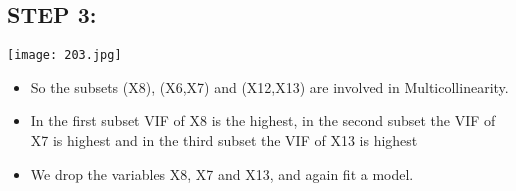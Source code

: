 \documentclass[a4paper,12pt,twoside]{book}
\begin{document}
\subsection*{STEP 3:}
\begin{center}
\texttt{[image: 203.jpg]}\\
\end{center}
\begin{itemize}
\item So the subsets (X8), (X6,X7) and (X12,X13) are involved in Multicollinearity.\\
\item In the first subset VIF of X8 is the highest, in the second subset the VIF of X7 is highest and in the third subset the VIF of X13 is highest\\
\item We drop the variables X8, X7 and X13, and again fit a model.\\
\end{itemize}
\end{document}
